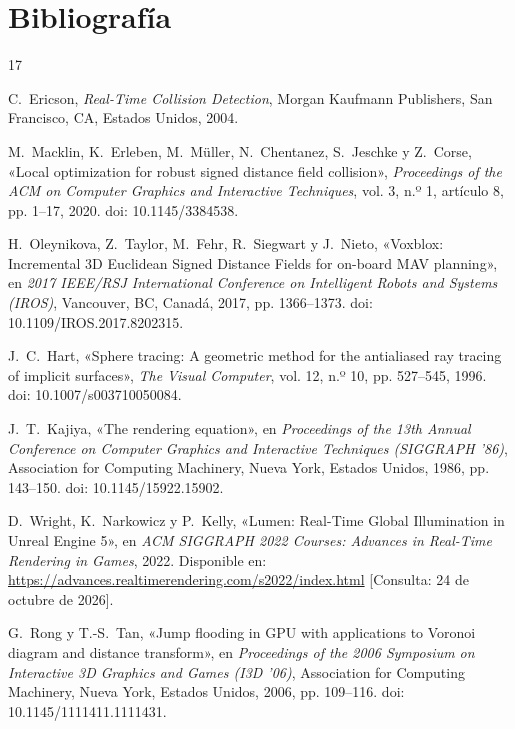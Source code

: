 \clearpage
\section{Bibliografía}

\begingroup
\sloppy
\renewcommand{\section}[2]{}%
\begin{thebibliography}{17}

 C.~Ericson, \textit{Real-Time Collision Detection}, Morgan Kaufmann Publishers, San Francisco, CA, Estados Unidos, 2004.

 M.~Macklin, K.~Erleben, M.~Müller, N.~Chentanez, S.~Jeschke y Z.~Corse, «Local optimization for robust signed distance field collision», \textit{Proceedings of the ACM on Computer Graphics and Interactive Techniques}, vol. 3, n.º 1, artículo 8, pp. 1--17, 2020. doi: 10.1145/3384538.

 H.~Oleynikova, Z.~Taylor, M.~Fehr, R.~Siegwart y J.~Nieto, «Voxblox: Incremental 3D Euclidean Signed Distance Fields for on-board MAV planning», en \textit{2017 IEEE/RSJ International Conference on Intelligent Robots and Systems (IROS)}, Vancouver, BC, Canadá, 2017, pp. 1366--1373. doi: 10.1109/IROS.2017.8202315.

 J.~C.~Hart, «Sphere tracing: A geometric method for the antialiased ray tracing of implicit surfaces», \textit{The Visual Computer}, vol. 12, n.º 10, pp. 527--545, 1996. doi: 10.1007/s003710050084.

 J.~T.~Kajiya, «The rendering equation», en \textit{Proceedings of the 13th Annual Conference on Computer Graphics and Interactive Techniques (SIGGRAPH ’86)}, Association for Computing Machinery, Nueva York, Estados Unidos, 1986, pp. 143--150. doi: 10.1145/15922.15902.

 D.~Wright, K.~Narkowicz y P.~Kelly, «Lumen: Real-Time Global Illumination in Unreal Engine 5», en \textit{ACM SIGGRAPH 2022 Courses: Advances in Real-Time Rendering in Games}, 2022. Disponible en: \url{https://advances.realtimerendering.com/s2022/index.html} [Consulta: 24 de octubre de 2026].

 G.~Rong y T.-S.~Tan, «Jump flooding in GPU with applications to Voronoi diagram and distance transform», en \textit{Proceedings of the 2006 Symposium on Interactive 3D Graphics and Games (I3D ’06)}, Association for Computing Machinery, Nueva York, Estados Unidos, 2006, pp. 109--116. doi: 10.1145/1111411.1111431.


\end{thebibliography}
